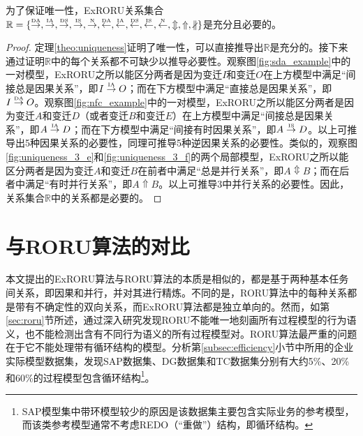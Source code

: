 \begin{theorem}[充分性和必要性]\label{theo:necessity_sufficiency}
为了保证唯一性，ExRORU关系集合$\mathbb{R}=\{\overset{\text{\tiny{DA}}}{\rightarrow},\overset{\text{\tiny{IA}}}{\rightarrow},\overset{\text{\tiny{DS}}}{\rightarrow},\overset{\text{\tiny{IS}}}{\rightarrow},\overset{\text{\tiny{N}}}{\rightarrow},\overset{\text{\tiny{DA}}}{\leftarrow},\overset{\text{\tiny{IA}}}{\leftarrow},\overset{\text{\tiny{DS}}}{\leftarrow},\overset{\text{\tiny{IS}}}{\leftarrow},\overset{\text{\tiny{N}}}{\leftarrow},\Updownarrow,\Uparrow,\nparallel\}$是充分且必要的。
\end{theorem}

\begin{proof}
定理\ref{theo:uniqueness}证明了唯一性，可以直接推导出$\mathbb{R}$是充分的。接下来通过证明$\mathbb{R}$中的每个关系都不可缺少以推导必要性。观察图\ref{fig:sda_example}中的一对模型，ExRORU之所以能区分两者是因为变迁$I$和变迁$O$在上方模型中满足“间接总是因果关系”，即$I\overset{\text{\tiny{IA}}}{\rightarrow}O$；而在下方模型中满足“直接总是因果关系”，即$I\overset{\text{\tiny{DA}}}{\rightarrow}O$。观察图\ref{fig:nfc_example}中的一对模型，ExRORU之所以能区分两者是因为变迁$A$和变迁$D$（或者变迁$B$和变迁$E$）在上方模型中满足“间接总是因果关系”，即$A\overset{\text{\tiny{IA}}}{\rightarrow}D$；而在下方模型中满足“间接有时因果关系”，即$A\overset{\text{\tiny{IS}}}{\rightarrow}D$。以上可推导出5种因果关系的必要性，同理可推导5种逆因果关系的必要性。类似的，观察图\ref{fig:uniqueness_3_e}和\ref{fig:uniqueness_3_f}的两个局部模型，ExRORU之所以能区分两者是因为变迁$A$和变迁$B$在前者中满足“总是并行关系”，即$A\Updownarrow B$；而在后者中满足“有时并行关系”，即$A\Uparrow B$。以上可推导3中并行关系的必要性。因此，关系集合$\mathbb{R}$中的关系都是必要的。
\end{proof}

\section{与RORU算法的对比}
本文提出的ExRORU算法与RORU算法的本质是相似的，都是基于两种基本任务间关系，即因果和并行，并对其进行精炼。不同的是，RORU算法中的每种关系都是带有不确定性的双向关系，而ExRORU算法都是独立单向的。然而，如第\ref{sec:roru}节所述，通过深入研究发现RORU不能唯一地刻画所有过程模型的行为语义，也不能检测出含有不同行为语义的所有过程模型对。RORU算法最严重的问题在于它不能处理带有循环结构的模型。分析第\ref{subsec:efficiency}小节中所用的企业实际模型数据集，发现SAP数据集、DG数据集和TC数据集分别有大约5\%、20\%和60\%的过程模型包含循环结构\footnote{SAP模型集中带环模型较少的原因是该数据集主要包含实际业务的参考模型，而该类参考模型通常不考虑REDO（“重做”）结构，即循环结构。}。

